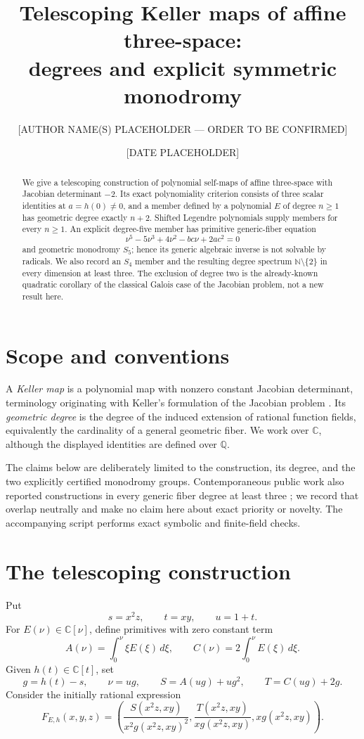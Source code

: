 \documentclass[11pt]{amsart}
\title[Degrees and monodromy of explicit Keller maps]{Telescoping Keller maps of affine three-space:\\ degrees and explicit symmetric monodromy}
\author{[AUTHOR NAME(S) PLACEHOLDER --- ORDER TO BE CONFIRMED]}
\date{[DATE PLACEHOLDER]}
\theoremstyle{remark}
\newcommand{\C}{\mathbb C}
\newcommand{\Q}{\mathbb Q}
\newcommand{\N}{\mathbb N}
\begin{document}
\begin{abstract}
We give a telescoping construction of polynomial self-maps of affine three-space with Jacobian determinant $-2$.  Its exact polynomiality criterion consists of three scalar identities at $a=h(0)\ne0$, and a member defined by a polynomial $E$ of degree $n\ge1$ has geometric degree exactly $n+2$.  Shifted Legendre polynomials supply members for every $n\ge1$.  An explicit degree-five member has primitive generic-fiber equation
\[
 \nu^5-5\nu^3+4\nu^2-bc\nu+2ac^2=0
\]
and geometric monodromy $S_5$; hence its generic algebraic inverse is not solvable by radicals.  We also record an $S_4$ member and the resulting degree spectrum $\N\setminus\{2\}$ in every dimension at least three.  The exclusion of degree two is the already-known quadratic corollary of the classical Galois case of the Jacobian problem, not a new result here.
\end{abstract}
\maketitle

\section{Scope and conventions}
A \emph{Keller map} is a polynomial map with nonzero constant Jacobian determinant, terminology originating with Keller's formulation of the Jacobian problem \cite{Keller39}.  Its \emph{geometric degree} is the degree of the induced extension of rational function fields, equivalently the cardinality of a general geometric fiber.  We work over $\C$, although the displayed identities are defined over $\Q$.

The claims below are deliberately limited to the construction, its degree, and the two explicitly certified monodromy groups.  Contemporaneous public work also reported constructions in every generic fiber degree at least three \cite{Gallagher26}; we record that overlap neutrally and make no claim here about exact priority or novelty.  The accompanying script performs exact symbolic and finite-field checks.

\section{The telescoping construction}
Put
\[
 s=x^2z,\qquad t=xy,\qquad u=1+t.
\]
For $E(\nu)\in\C[\nu]$, define primitives with zero constant term
\[
 A(\nu)=\int_0^\nu \xi E(\xi)\,d\xi,
 \qquad C(\nu)=2\int_0^\nu E(\xi)\,d\xi.
\]
Given $h(t)\in\C[t]$, set
\[
 g=h(t)-s,\qquad \nu=ug,
 \qquad S=A(ug)+ug^2,\qquad T=C(ug)+2g.
\]
Consider the initially rational expression
\begin{equation}\label{eq:family}
 F_{E,h}(x,y,z)=
 \left(\frac{S(x^2z,xy)}{x^2g(x^2z,xy)^2},
       \frac{T(x^2z,xy)}{xg(x^2z,xy)},
       xg(x^2z,xy)\right).
\end{equation}
\end{document}

